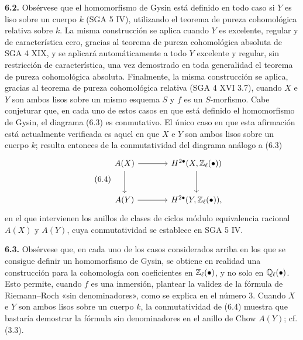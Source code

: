 \textbf{6.2.} Obsérvese que el homomorfismo de Gysin está definido en todo
caso si $Y$ es liso sobre un cuerpo $k$ (SGA 5 IV), utilizando el teorema de
pureza cohomológica relativa sobre $k$. La misma construcción se aplica
cuando $Y$ es excelente, regular y de característica cero, gracias al
teorema de pureza cohomológica absoluta de SGA 4 XIX, y se aplicará
automáticamente a todo $Y$ excelente y regular, sin restricción de
característica, una vez demostrado en toda generalidad el teorema de pureza
cohomológica absoluta. Finalmente, la misma construcción se aplica, gracias
al teorema de pureza cohomológica relativa (SGA 4 XVI 3.7), cuando $X$ e $Y$
son ambos lisos sobre un mismo esquema $S$ y $f$ es un $S$-morfismo. Cabe
conjeturar que, en cada uno de estos casos en que está definido el
homomorfismo de Gysin, el diagrama (6.3) es conmutativo. El único caso en que
esta afirmación está actualmente verificada es aquel en que $X$ e $Y$ son
ambos lisos sobre un cuerpo $k$; resulta entonces de la conmutatividad del
diagrama análogo a (6.3)
\begin{equation}\tag{6.4}
\begin{tikzcd}[column sep=large,row sep=large]
A(X) \arrow[r] \arrow[d] & H^{2\bullet}(X,\Zell(\bullet)) \arrow[d] \\
A(Y) \arrow[r] & H^{2\bullet}(Y,\Zell(\bullet)),
\end{tikzcd}
\end{equation}
en el que intervienen los anillos de clases de ciclos módulo equivalencia
racional $A(X)$ y $A(Y)$, cuya conmutatividad se establece en SGA 5 IV.

\textbf{6.3.} Obsérvese que, en cada uno de los casos considerados arriba en
los que se consigue definir un homomorfismo de Gysin, se obtiene en realidad
una construcción para la cohomología con coeficientes en $\mathbb Z_\ell(\bullet)$,
y no solo en $\mathbb Q_\ell(\bullet)$. Esto permite, cuando $f$ es una inmersión,
plantear la validez de la fórmula de Riemann--Roch «sin denominadores», como
se explica en el número 3. Cuando $X$ e $Y$ son ambos lisos sobre un cuerpo
$k$, la conmutatividad de (6.4) muestra que bastaría demostrar la fórmula sin
denominadores en el anillo de Chow $A(Y)$; cf. (3.3).

